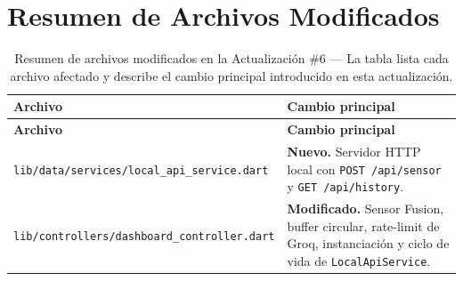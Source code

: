 \documentclass[12pt,a4paper]{article}
\begin{document}
\section{Resumen de Archivos Modificados}

\begin{longtable}{p{7.5cm} p{6cm}}
\caption{Resumen de archivos modificados en la Actualización \#6 --- La tabla lista
  cada archivo afectado y describe el cambio principal introducido en esta actualización.}
\label{tab:archivos-resumen} \\
\toprule
\textbf{Archivo} & \textbf{Cambio principal} \\
\midrule
\endfirsthead
\toprule
\textbf{Archivo} & \textbf{Cambio principal} \\
\midrule
\endhead
\bottomrule
\endlastfoot
\texttt{lib/data/services/local\_api\_service.dart} &
  \textbf{Nuevo.} Servidor HTTP local con \texttt{POST /api/sensor} y
  \texttt{GET /api/history}. \\[0.5em]
\texttt{lib/controllers/dashboard\_controller.dart} &
  \textbf{Modificado.} Sensor Fusion, buffer circular, rate-limit de Groq,
  instanciación y ciclo de vida de \texttt{LocalApiService}. \\
\end{longtable}
\end{document}
